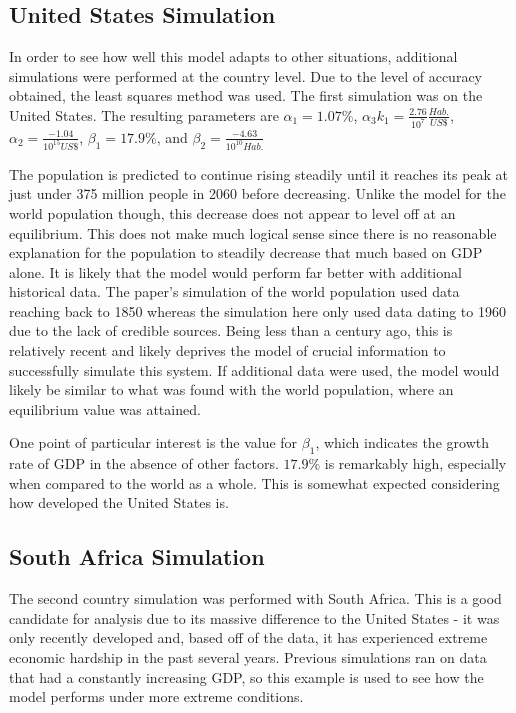 \documentclass[a4paper]{article}
\begin{document}
\subsection{United States Simulation}

In order to see how well this model adapts to other situations, additional simulations were performed at the country level. Due to the level of accuracy obtained, the least squares method was used. The first simulation was on the United States. The resulting parameters are $\alpha_1 = 1.07\%$, $\alpha_3 k_1 = \frac{2.76}{10^{7}}\frac{Hab.}{US \$}$, $\alpha_2 = \frac{-1.04}{10^{15} US\$}$, $\beta_1 = 17.9\%$, and $\beta_2 = \frac{-4.63}{10^{10} Hab.}$ 

The population is predicted to continue rising steadily until it reaches its peak at just under 375 million people in 2060 before decreasing. Unlike the model for the world population though, this decrease does not appear to level off at an equilibrium. This does not make much logical sense since there is no reasonable explanation for the population to steadily decrease that much based on GDP alone. It is likely that the model would perform far better with additional historical data. The paper's simulation of the world population used data reaching back to 1850 whereas the simulation here only used data dating to 1960 due to the lack of credible sources. Being less than a century ago, this is relatively recent and likely deprives the model of crucial information to successfully simulate this system. If additional data were used, the model would likely be similar to what was found with the world population, where an equilibrium value was attained.

One point of particular interest is the value for $\beta_1$, which indicates the growth rate of GDP in the absence of other factors. $17.9\%$ is remarkably high, especially when compared to the world as a whole. This is somewhat expected considering how developed the United States is. 

\subsection{South Africa Simulation}

The second country simulation was performed with South Africa. This is a good candidate for analysis due to its massive difference to the United States - it was only recently developed and, based off of the data, it has experienced extreme economic hardship in the past several years. Previous simulations ran on data that had a constantly increasing GDP, so this example is used to see how the model performs under more extreme conditions.
\end{document}

